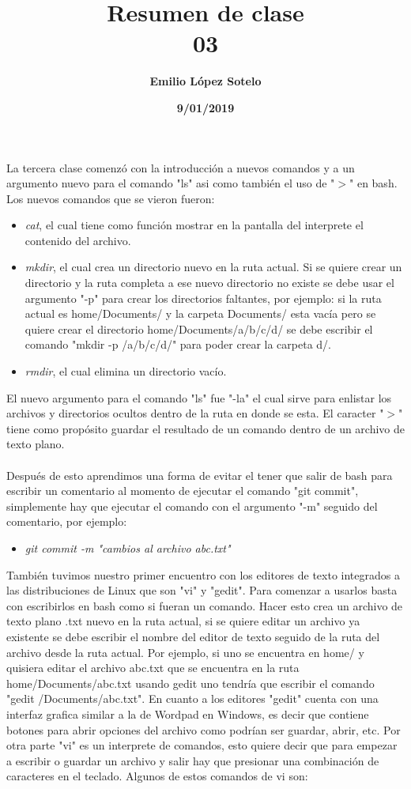 \documentclass[letterpaper, 12pt, oneside]{article}
\title{\Huge \textbf{Resumen de clase\\03}}
\author{\textbf{Emilio López Sotelo}}
\date{\textbf{9/01/2019}}
\begin{document}
	\maketitle
	La tercera clase comenzó con la introducción a nuevos comandos y a un argumento nuevo para el comando "ls" asi como también el uso de "$>$" en bash. Los nuevos comandos que se vieron fueron:
	\begin{itemize}
		\item \textit{cat}, el cual tiene como función mostrar en la pantalla del interprete el contenido del archivo.
		\item \textit{mkdir}, el cual crea un directorio nuevo en la ruta actual. Si se quiere crear un directorio y la ruta completa a ese nuevo directorio no existe se debe usar el argumento "-p" para crear los directorios faltantes, por ejemplo: si la ruta actual es home/Documents/ y la carpeta Documents/ esta vacía pero se quiere crear el directorio home/Documents/a/b/c/d/ se debe escribir el comando "mkdir -p /a/b/c/d/" para poder crear la carpeta d/.
		\item \textit{rmdir}, el cual elimina un directorio vacío.
	\\
	\end{itemize}
	El nuevo argumento para el comando "ls" fue "-la" el cual sirve para enlistar los archivos y directorios ocultos dentro de la ruta en donde se esta. El caracter "$>$" tiene como propósito guardar el resultado de un comando dentro de un archivo de texto plano.
	\\
	\\
	Después de esto aprendimos una forma de evitar el tener que salir de bash para escribir un comentario al momento de ejecutar el comando "git commit", simplemente hay que ejecutar el comando con el argumento "-m" seguido del comentario, por ejemplo:
	\begin{itemize}
		\item \textit{git commit -m "cambios al archivo abc.txt"}
	\\
	\end{itemize}
	También tuvimos nuestro primer encuentro con los editores de texto integrados a las distribuciones de Linux que son "vi" y "gedit". Para comenzar a usarlos basta con escribirlos en bash como si fueran un comando. Hacer esto crea un archivo de texto plano .txt nuevo en la ruta actual, si se quiere editar un archivo ya existente se debe escribir el nombre del editor de texto seguido de la ruta del archivo desde la ruta actual. Por ejemplo, si uno se encuentra en home/ y quisiera editar el archivo abc.txt que se encuentra en la ruta home/Documents/abc.txt usando gedit uno tendría que escribir el comando "gedit /Documents/abc.txt". En cuanto a los editores "gedit" cuenta con una interfaz grafica similar a la de Wordpad en Windows, es decir que contiene botones para abrir opciones del archivo como podrían ser guardar, abrir, etc. Por otra parte "vi" es un interprete de comandos, esto quiere decir que para empezar a escribir o guardar un archivo y salir hay que presionar una combinación de caracteres en el teclado. Algunos de estos comandos de vi son:
\end{document}
